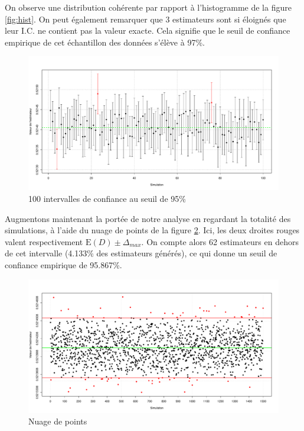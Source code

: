 \documentclass[paper=a4, fontsize=11pt]{scrartcl}
\begin{document}
On observe une distribution cohérente par rapport à l'histogramme de la figure \ref{fig:hist}. On peut également remarquer que 3 estimateurs sont si éloignés que leur I.C. ne contient pas la valeur exacte. Cela signifie que le seuil de confiance empirique de cet échantillon des données s'élève à 97\%.

\begin{figure}[b!]
  \centering
  \includegraphics[scale=0.46]{../analysis/plots/CIplot.pdf}
  \caption{100 intervalles de confiance au seuil de 95\%}
  \label{fig:CIPlot}
\end{figure}

Augmentons maintenant la portée de notre analyse en regardant la totalité des simulations, à l'aide du nuage de points de la figure \ref{fig:PointsCloud}. Ici, les deux droites rouges valent respectivement $\text{E}(D) \pm \Delta_{max}$. On compte alors 62 estimateurs en dehors de cet intervalle (4.133\% des estimateurs générés), ce qui donne un seuil de confiance empirique de 95.867\%.

\begin{figure}[b!]
  \centering
  \includegraphics[scale=0.46]{../analysis/plots/PointsCloud.pdf}
  \caption{Nuage de points}
  \label{fig:PointsCloud}
\end{figure}
\end{document}
